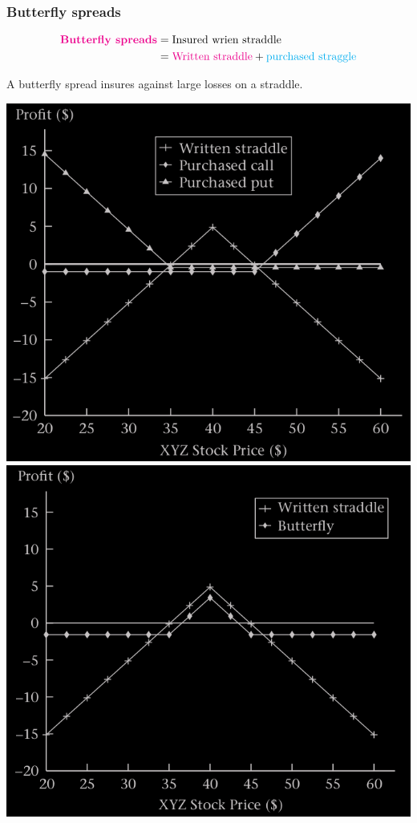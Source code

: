 \begin{frame}[fragile,t]
	\frametitle{Butterfly spreads}
	\begin{align*}
		\text{\textcolor{magenta}{\bf Butterfly spreads}} & = \text{Insured wri\text{en straddle}} \\
																											& = \text{\textcolor{magenta}{Written straddle}}  + \text{\textcolor{cyan}{purchased straggle}}
	\end{align*}

	\begin{center}
		A butterfly spread insures against large losses on a straddle.
		\bigskip
		\bigskip

		\includegraphics[scale=0.2]{figs/Figure-3-13.png}
		\quad
		\includegraphics[scale=0.2]{figs/Figure-3-14.png}
	\end{center}
\end{frame}
